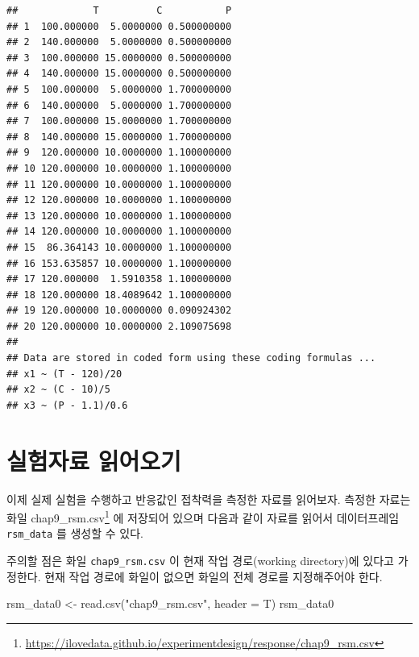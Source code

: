 \documentclass[
]{book}
\newenvironment{Shaded}{\begin{snugshade}}{\end{snugshade}}
\newcommand{\AttributeTok}[1]{\textcolor[rgb]{0.77,0.63,0.00}{#1}}
\newcommand{\FunctionTok}[1]{\textcolor[rgb]{0.00,0.00,0.00}{#1}}
\newcommand{\NormalTok}[1]{#1}
\newcommand{\OtherTok}[1]{\textcolor[rgb]{0.56,0.35,0.01}{#1}}
\newcommand{\StringTok}[1]{\textcolor[rgb]{0.31,0.60,0.02}{#1}}
\renewcommand{\href}[2]{#2\footnote{\url{#1}}}
\theoremstyle{definition}
\theoremstyle{definition}
\theoremstyle{definition}
\theoremstyle{definition}
\theoremstyle{remark}
\begin{document}
\begin{verbatim}
##             T          C           P
## 1  100.000000  5.0000000 0.500000000
## 2  140.000000  5.0000000 0.500000000
## 3  100.000000 15.0000000 0.500000000
## 4  140.000000 15.0000000 0.500000000
## 5  100.000000  5.0000000 1.700000000
## 6  140.000000  5.0000000 1.700000000
## 7  100.000000 15.0000000 1.700000000
## 8  140.000000 15.0000000 1.700000000
## 9  120.000000 10.0000000 1.100000000
## 10 120.000000 10.0000000 1.100000000
## 11 120.000000 10.0000000 1.100000000
## 12 120.000000 10.0000000 1.100000000
## 13 120.000000 10.0000000 1.100000000
## 14 120.000000 10.0000000 1.100000000
## 15  86.364143 10.0000000 1.100000000
## 16 153.635857 10.0000000 1.100000000
## 17 120.000000  1.5910358 1.100000000
## 18 120.000000 18.4089642 1.100000000
## 19 120.000000 10.0000000 0.090924302
## 20 120.000000 10.0000000 2.109075698
## 
## Data are stored in coded form using these coding formulas ...
## x1 ~ (T - 120)/20
## x2 ~ (C - 10)/5
## x3 ~ (P - 1.1)/0.6
\end{verbatim}

\hypertarget{uxc2e4uxd5d8uxc790uxb8cc-uxc77duxc5b4uxc624uxae30}{%
\section{실험자료 읽어오기}\label{uxc2e4uxd5d8uxc790uxb8cc-uxc77duxc5b4uxc624uxae30}}

이제 실제 실험을 수행하고 반응값인 접착력을 측정한 자료를 읽어보자. 측정한 자료는 화일 \href{https://ilovedata.github.io/experimentdesign/response/chap9_rsm.csv}{chap9\_rsm.csv} 에 저장되어 있으며 다음과 같이 자료를 읽어서 데이터프레임\texttt{rsm\_data} 를 생성할 수 있다.

주의할 점은 화일 \texttt{chap9\_rsm.csv} 이 현재 작업 경로(working directory)에 있다고 가정한다. 현재 작업 경로에 화일이 없으면 화일의 전체 경로를 지정해주어야 한다.

\begin{Shaded}
\begin{Highlighting}[]
\NormalTok{rsm\_data0 }\OtherTok{\textless{}{-}} \FunctionTok{read.csv}\NormalTok{(}\StringTok{"chap9\_rsm.csv"}\NormalTok{, }\AttributeTok{header =}\NormalTok{ T)}
\NormalTok{rsm\_data0}
\end{Highlighting}
\end{Shaded}
\end{document}
